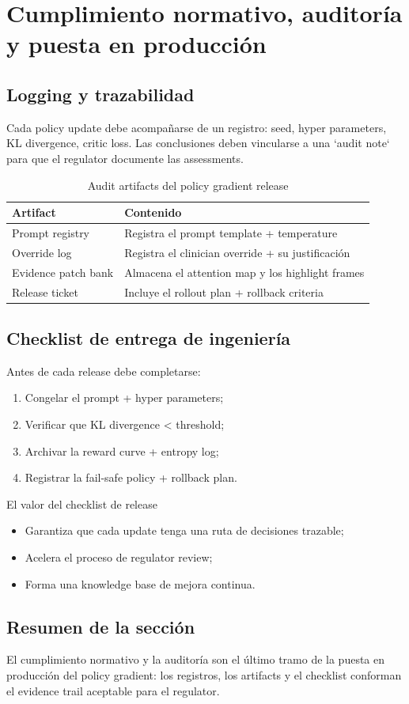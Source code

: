 \section{Cumplimiento normativo, auditoría y puesta en producción}
\subsection{Logging y trazabilidad}
Cada policy update debe acompañarse de un registro: seed, hyper parameters, KL divergence, critic loss. Las conclusiones deben vincularse a una `audit note` para que el regulator documente las assessments.

\begin{table}[H]
\centering
\small
\begin{tabular}{p{}p{}}
\toprule
Artifact & Contenido \\
\midrule
Prompt registry & Registra el prompt template + temperature \\
Override log & Registra el clinician override + su justificación \\
Evidence patch bank & Almacena el attention map y los highlight frames \\
Release ticket & Incluye el rollout plan + rollback criteria \\
\bottomrule
\end{tabular}
\caption{Audit artifacts del policy gradient release}
\end{table}

\subsection{Checklist de entrega de ingeniería}
Antes de cada release debe completarse:
\begin{enumerate}
    \item Congelar el prompt + hyper parameters;
    \item Verificar que KL divergence < threshold;
    \item Archivar la reward curve + entropy log;
    \item Registrar la fail-safe policy + rollback plan.
\end{enumerate}

\begin{importantbox}{El valor del checklist de release}
\begin{itemize}
    \item Garantiza que cada update tenga una ruta de decisiones trazable;
    \item Acelera el proceso de regulator review;
    \item Forma una knowledge base de mejora continua.
\end{itemize}
\end{importantbox}

\subsection{Resumen de la sección}
El cumplimiento normativo y la auditoría son el último tramo de la puesta en producción del policy gradient: los registros, los artifacts y el checklist conforman el evidence trail aceptable para el regulator.
